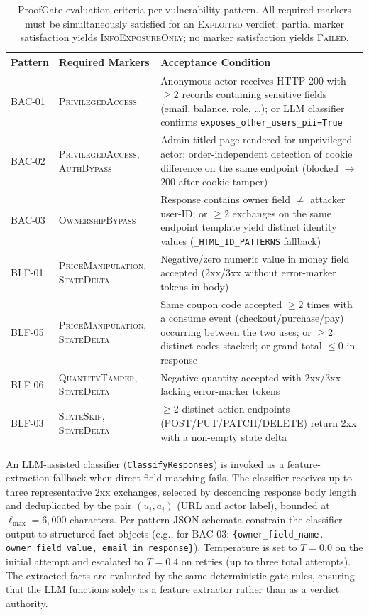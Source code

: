\begin{table}[htbp]
\centering
\caption{ProofGate evaluation criteria per vulnerability pattern.
All required markers must be simultaneously satisfied for an
\textsc{Exploited} verdict; partial marker satisfaction yields
\textsc{InfoExposureOnly}; no marker satisfaction yields
\textsc{Failed}.}
\label{tab:proof_rules}
\begin{tabular}{p{1.6cm} p{3.0cm} p{3.8cm}}
\toprule
\textbf{Pattern} & \textbf{Required Markers} & \textbf{Acceptance Condition} \\
\midrule
BAC-01 & \textsc{PrivilegedAccess} &
  Anonymous actor receives HTTP 200 with $\geq 2$ records
  containing sensitive fields (email, balance, role, \ldots);
  or LLM classifier confirms \texttt{exposes\_other\_users\_pii=True} \\[4pt]
BAC-02 & \textsc{PrivilegedAccess}, \textsc{AuthBypass} &
  Admin-titled page rendered for unprivileged actor;
  order-independent detection of cookie difference on the same
  endpoint (blocked $\to$ 200 after cookie tamper) \\[4pt]
BAC-03 & \textsc{OwnershipBypass} &
  Response contains owner field $\neq$ attacker user-ID;
  or $\geq 2$ exchanges on the same endpoint template yield
  distinct identity values (\texttt{\_HTML\_ID\_PATTERNS} fallback) \\[4pt]
BLF-01 & \textsc{PriceManipulation}, \textsc{StateDelta} &
  Negative/zero numeric value in money field accepted
  (2xx/3xx without error-marker tokens in body) \\[4pt]
BLF-05 & \textsc{PriceManipulation}, \textsc{StateDelta} &
  Same coupon code accepted $\geq 2$ times with a consume event
  (checkout/purchase/pay) occurring between the two uses;
  or $\geq 2$ distinct codes stacked; or
  grand-total $\leq 0$ in response \\[4pt]
BLF-06 & \textsc{QuantityTamper}, \textsc{StateDelta} &
  Negative quantity accepted with 2xx/3xx lacking error-marker tokens \\[4pt]
BLF-03 & \textsc{StateSkip}, \textsc{StateDelta} &
  $\geq 2$ distinct action endpoints (POST/PUT/PATCH/DELETE)
  return 2xx with a non-empty state delta \\
\bottomrule
\end{tabular}
\end{table}

An LLM-assisted classifier (\texttt{ClassifyResponses}) is invoked as a
feature-extraction fallback when direct field-matching fails.
The classifier receives up to three representative 2xx exchanges,
selected by descending response body length and deduplicated by the
pair $(u_i, a_i)$ (URL and actor label), bounded at
$\ell_{\max} = 6{,}000$ characters.
Per-pattern JSON schemata constrain the classifier output to structured
fact objects (e.g., for BAC-03: \texttt{\{owner\_field\_name,
owner\_field\_value, email\_in\_response\}}).
Temperature is set to $T = 0.0$ on the initial attempt and escalated
to $T = 0.4$ on retries (up to three total attempts).
The extracted facts are evaluated by the same deterministic gate rules,
ensuring that the LLM functions solely as a feature extractor rather
than as a verdict authority.


